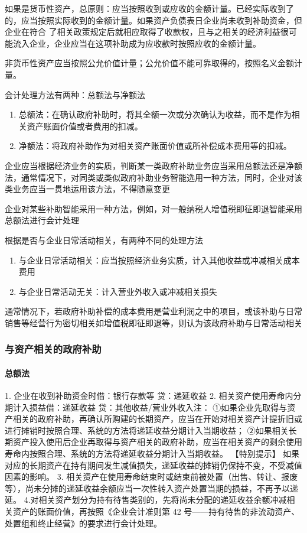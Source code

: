 \documentclass[UTF8,12pt]{ctexart}
\numberwithin{equation}{section} %
\numberwithin{figure}{section}
\numberwithin{table}{section}
\begin{document}
	如果是货币性资产，总原则：应当按照收到或应收的金额计量。已经实际收到了的，应当按照实际收到的金额计量。如果资产负债表日企业尚未收到补助资金，但企业在符合 了相关政策规定后就相应取得了收款权，且与之相关的经济利益很可能流入企业，企业应当在这项补助成为应收款时按照应收的金额计量。
	
	非货币性资产应当按照公允价值计量；公允价值不能可靠取得的，按照名义金额计量。
	
	会计处理方法有两种：总额法与净额法
	\begin{enumerate}
		\item 总额法：在确认政府补助时，将其全额一次或分次确认为收益，而不是作为相关资产账面价值或者费用的扣减。
		
		\item 净额法：将政府补助作为对相关资产账面价值或所补偿成本费用等的扣减。
	\end{enumerate}
	
	企业应当根据经济业务的实质，判断某一类政府补助业务应当采用总额法还是净额法，通常情况下，对同类或类似政府补助业务智能选用一种方法，同时，企业对该类业务应当一贯地运用该方法，不得随意变更
	
	企业对某些补助智能采用一种方法，例如，对一般纳税人增值税即征即退智能采用总额法进行会计处理
	
	根据是否与企业日常活动相关，有两种不同的处理方法
	\begin{enumerate}
		\item 与企业日常活动相关：应当按照经济业务实质，计入其他收益或冲减相关成本费用
		
		\item 与企业日常活动无关：计入营业外收入或冲减相关损失
	\end{enumerate}
	通常情况下，若政府补助补偿的成本费用是营业利润之中的项目，或该补助与日常销售等经营行为密切相关如增值税即征即退等，则认为该政府补助与日常活动相关
	
	\subsubsection{与资产相关的政府补助}
	\paragraph{总额法}
	1.	企业在收到补助资金时借：银行存款等
	贷：递延收益
	2.	相关资产使用寿命内分期计入损益借：递延收益
	贷：其他收益/营业外收入注：
	①如果企业先取得与资产相关的政府补助，再确认所购建的长期资产，应当在开始对相关资产计提折旧或进行摊销时按照合理、系统的方法将递延收益分期计入当期收益；
	②如果相关长期资产投入使用后企业再取得与资产相关的政府补助，应当在相关资产的剩余使用寿命内按照合理、系统的方法将递延收益分期计入当期收益。
	【特别提示】
	如果对应的长期资产在持有期间发生减值损失，递延收益的摊销仍保持不变，不受减值因素的影响。
	3.	相关资产在使用寿命结束时或结束前被处置（出售、转让、报废等），尚未分摊的递延收益余额应当一次性转入资产处置当期的损益，不再予以递延。
	4.对相关资产划分为持有待售类别的，先将尚未分配的递延收益余额冲减相关资产的账面价值，再按照《企业会计准则第 42 号——持有待售的非流动资产、处置组和终止经营》的要求进行会计处理。
\end{document}
